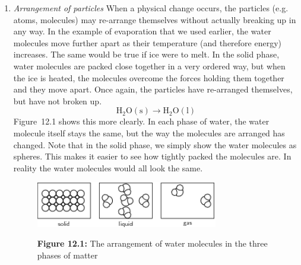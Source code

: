       \label{m38709*id62644}\begin{enumerate}[noitemsep, label=\textbf{\arabic*}. ] 
            \label{m38709*uid1}\item \textsl{Arrangement of particles}\newline
When a physical change occurs, the particles (e.g. atoms, molecules) may re-arrange themselves without actually breaking up in any way. In the example of evaporation that we used earlier, the water molecules move further apart as their temperature (and therefore energy) increases. The same would be true if ice were to melt. In the solid phase, water molecules are packed close together in a very ordered way, but when the ice is heated, the molecules overcome the forces holding them together and they move apart. Once again, the particles have re-arranged themselves, but have not broken up.
\label{m38709*eid2342}\nopagebreak\noindent{}
    \begin{equation}
    \mathrm{H}{}_{2}\mathrm{O}\left(\mathrm{s}\right)\to \mathrm{H}{}_{2}\mathrm{O}\left(\mathrm{l}\right)\tag{12.1}
      \end{equation}
Figure~12.1 shows this more clearly. In each phase of water, the water molecule itself stays the same, but the way the molecules are arranged has changed. Note that in the solid phase, we simply show the water molecules as spheres. This makes it easier to see how tightly packed the molecules are. In reality the water molecules would all look the same.
    \setcounter{subfigure}{0}
	\begin{figure}[H] %
    \begin{center}
    \label{m38709*uid2!!!underscore!!!media}\label{m38709*uid2!!!underscore!!!printimage}\includegraphics[width=300px]{col11305.imgs/m38709_CG10C4_001.png} %
      \vspace{2pt}
    \vspace{\rubberspace}\par \begin{cnxcaption}
	  \small \textbf{Figure 12.1: }The arrangement of water molecules in the three phases of matter
	\end{cnxcaption}
    \vspace{.1in}
    \end{center}

\end{figure}
\end{enumerate}
